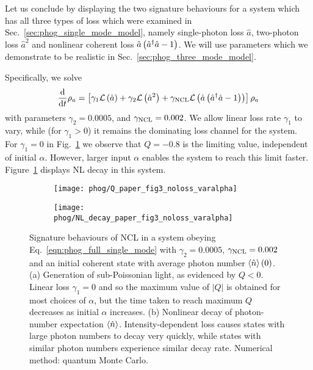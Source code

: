 Let us conclude by displaying the two signature behaviours for a system which has all three types of loss which were examined in Sec.~\ref{sec:phog_single_mode_model}, namely single-photon loss $\hat{a}$, two-photon loss $\hat{a}^2$ and nonlinear coherent loss $\hat{a}\left(\hat{a}^\dagger \hat{a} - 1\right)$. We will use parameters which we demonstrate to be realistic in Sec.~\ref{sec:phog_three_mode_model}.

Specifically, we solve
\begin{equation}\label{eqn:phog_full_single_mode}
\frac{\mathrm{d}}{\mathrm{d}t} \rho_a = \left[\gamma_1 \mathcal{L}\left(\hat{a}\right) + \gamma_2 \mathcal{L}\left(\hat{a}^2\right) + \gamma_{\text{NCL}} \mathcal{L}\left(\hat{a}\left(\hat{a}^\dagger \hat{a} - 1\right)\right) \right] \rho_a
\end{equation}
with parameters $\gamma_2 = 0.0005$, and $\gamma_{\text{NCL}} = 0.002$. We allow linear loss rate $\gamma_1$ to vary, while (for $\gamma_1 >0$) it remains the dominating loss channel for the system. For $\gamma_1=0$ in Fig.~\ref{fig:phog_fig3paper} we observe that $Q = -0.8$ is the limiting value, independent of initial $\alpha$. However, larger input $\alpha$ enables the system to reach this limit faster. Figure~\ref{fig:phog_fig3paper} displays NL decay in this system.

\begin{figure}[htp]
\captionsetup{width=\linewidth}
\centering
	\begin{subfigure}{0.7\linewidth}
	\centering
	\caption{}
	\texttt{[image: phog/Q\_paper\_fig3\_noloss\_varalpha]}
	\end{subfigure}
	\begin{subfigure}{0.7\linewidth}
	\centering
	\caption{}
	\texttt{[image: phog/NL\_decay\_paper\_fig3\_noloss\_varalpha]}
	\end{subfigure}
\caption{\label{fig:phog_fig3paper} Signature behaviours of NCL in a system obeying Eq.~\ref{eqn:phog_full_single_mode} with $\gamma_2 = 0.0005$, $\gamma_{\text{NCL}} = 0.002$ and an initial coherent state with average photon number $\ev{\hat{n}}\left(0\right)$. (a) Generation of sub-Poissonian light, as evidenced by $Q<0$. Linear loss $\gamma_1=0$ and so the maximum value of $\left|Q\right|$ is obtained for most choices of $\alpha$, but the time taken to reach maximum $Q$ decreases as initial $\alpha$ increases. (b) Nonlinear decay of photon-number expectation $\ev{\hat{n}}$. Intensity-dependent loss causes states with large photon numbers to decay very quickly, while states with similar photon numbers experience similar decay rate. Numerical method: quantum Monte Carlo.}
\end{figure}

